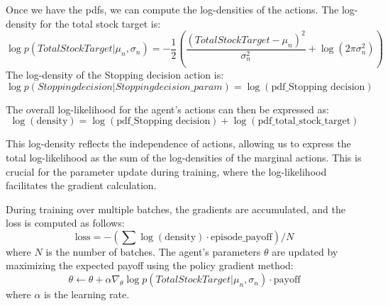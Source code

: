 \documentclass[a4paper, 12pt]{article}
\begin{document}
Once we have the pdfs, we can compute the log-densities of the actions. The log-density for the total stock target is:
\[
\log p(TotalStockTarget | \mu_n, \sigma_n) = -\frac{1}{2} \left( \frac{(TotalStockTarget - \mu_n)^2}{\sigma_n^2} + \log(2\pi\sigma_n^2) \right)
\]
The log-density of the Stopping decision action is:
\[
\log p(Stopping decision | Stopping decision\_param) = \log(\text{pdf\_Stopping decision})
\]

The overall log-likelihood for the agent's actions can then be expressed as:
\[
\log(\text{density}) = \log(\text{pdf\_Stopping decision}) + \log(\text{pdf\_total\_stock\_target})
\]

This log-density reflects the independence of actions, allowing us to express the total log-likelihood as the sum of the log-densities of the marginal actions. This is crucial for the parameter update during training, where the log-likelihood facilitates the gradient calculation.

During training over multiple batches, the gradients are accumulated, and the loss is computed as follows:
\[
\text{loss} = -\left( \sum \log(\text{density}) \cdot \text{episode\_payoff} \right) / N
\]
where \( N \) is the number of batches. The agent's parameters \( \theta \) are updated by maximizing the expected payoff using the policy gradient method:
\[
\theta \leftarrow \theta + \alpha \nabla_\theta \log p(TotalStockTarget | \mu_n, \sigma_n) \cdot \text{payoff}
\]
where \( \alpha \) is the learning rate.
\end{document}
